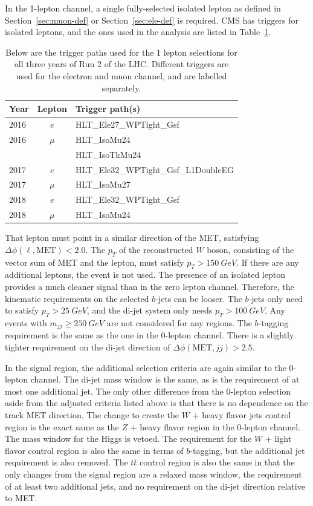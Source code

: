 In the 1-lepton channel, a single fully-selected isolated lepton as defined in
Section~\ref{sec:muon-def} or Section~\ref{sec:ele-def} is required.
CMS has triggers for isolated leptons,
and the ones used in the analysis are listed in Table~\ref{tab:1-triggers}.
\begin{table}
  \centering
  \caption[Triggers for the 1 lepton selections]{
    Below are the trigger paths used for the 1 lepton selections
    for all three years of Run 2 of the LHC.
    Different triggers are used for the electron and muon channel,
    and are labelled separately.
  }
  \begin{tabular}{|l|c|l|}
    \hline
    Year & Lepton & Trigger path(s) \\
    \hline
    2016 & $e$ & HLT\_Ele27\_WPTight\_Gsf \\
    \hline
    2016 & $\mu$ & HLT\_IsoMu24 \\
    & & HLT\_IsoTkMu24 \\
    \hline
    2017 & $e$ & HLT\_Ele32\_WPTight\_Gsf\_L1DoubleEG \\
    \hline
    2017 & $\mu$ & HLT\_IsoMu27 \\
    \hline
    2018 & $e$ & HLT\_Ele32\_WPTight\_Gsf \\
    \hline
    2018 & $\mu$ & HLT\_IsoMu24 \\
    \hline
  \end{tabular}
  \label{tab:1-triggers}
\end{table}
That lepton must point in a similar direction of the MET,
satisfying $\Delta \phi(\ell, \mathrm{MET}) < 2.0$.
The $p_T$ of the reconstructed $W$ boson, consisting of the vector sum of MET and the lepton,
must satisfy $p_T > \SI{150}{GeV}$.
If there are any additional leptons, the event is not used.
The presence of an isolated lepton provides
a much cleaner signal than in the zero lepton channel.
Therefore, the kinematic requirements on the selected $b$-jets can be looser.
The $b$-jets only need to satisfy $p_T > \SI{25}{GeV}$,
and the di-jet system only needs $p_T > \SI{100}{GeV}$.
Any events with $m_{jj} \ge \SI{250}{GeV}$ are not considered for any regions.
The $b$-tagging requirement is the same as the one in the 0-lepton channel.
There is a slightly tighter requirement on the di-jet direction of
$\Delta\phi(\mathrm{MET}, jj) > 2.5$.

In the signal region, the additional selection criteria are again similar to the 0-lepton channel.
The di-jet mass window is the same, as is the requirement of at most one additional jet.
The only other difference from the 0-lepton selection
aside from the adjusted criteria listed above
is that there is no dependence on the track MET direction.
The change to create the $W$ + heavy flavor jets control region is the exact same as the
$Z$ + heavy flavor region in the 0-lepton channel.
The mass window for the Higgs is vetoed.
The requirement for the $W$ + light flavor control region is also the same in terms of $b$-tagging,
but the additional jet requirement is also removed.
The $t\bar{t}$ control region is also the same in that
the only changes from the signal region
are a relaxed mass window, the requirement of at least two additional jets,
and no requirement on the di-jet direction relative to MET.

